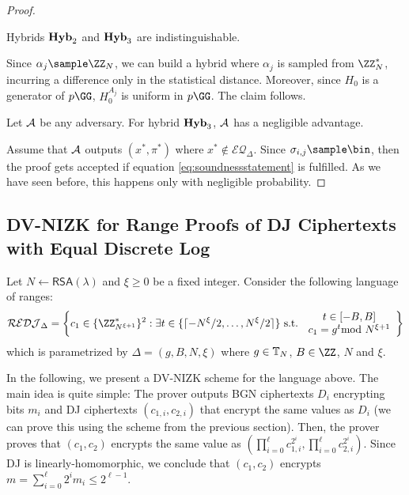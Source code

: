 \begin{proof}
\begin{claim}
Hybrids $\mathsf{\mathbf{Hyb}}_2$ and $\mathsf{\mathbf{Hyb}}_3$ are indistinguishable.
\end{claim}

Since $\alpha_j\sample \ZZ_N$, we can build a hybrid where $\alpha_j$ is sampled from $\ZZ_N^*$, incurring a difference only in the statistical distance. Moreover, since $H_0$ is a generator of $p\GG$, $H_0^{A_j}$ is uniform in $p\GG$. The claim follows.

 \begin{claim}
 \label{claim:neglsound}
 Let $\mathcal{A}$ be any adversary. For hybrid $\mathsf{\mathbf{Hyb}}_3$, $\mathcal{A}$ has a negligible advantage.
 \end{claim}

Assume that $\mathcal{A}$ outputs $(x^*,\pi^*)$ where $x^*\notin \mathcal{EQ}_\Delta$. Since $\sigma_{i,j}\sample \bin$, then the proof gets accepted if equation \ref{eq:soundnessstatement} is fulfilled. As we have seen before, this happens only with negligible probability.

\end{proof}



\subsection{DV-NIZK for Range Proofs of DJ Ciphertexts with Equal Discrete Log}

Let $N\leftarrow\mathsf{RSA}(\lambda)$ and $\xi\geq 0$ be a fixed integer. 
Consider the following language of ranges: 
$$\mathcal{REDJ}_{\Delta}=\left\{c_1\in \{\ZZ^\ast_{N^{\xi+1}}\}^2
:\exists t\in \{\lceil- N^\xi/2,\dots, N^\xi/2 \rceil\}%
\text{ s.t. }\begin{array}{c}
     t\in [-B,B] \\
     c_1=g^t \smod N^{\xi+1}\\ 
\end{array}\right \}$$ which is parametrized by $\Delta=(g,B,N,\xi) $ where $g\in \mathbb{T}_N$, $B\in\ZZ$,  $N$ and $\xi$.


In the following, we present a DV-NIZK scheme for the language above. The main idea is quite simple: The prover outputs BGN ciphertexts $D_i$ encrypting bits $m_i$ and DJ ciphertexts $(c_{1,i},c_{2,i})$ that encrypt the same values as $D_i$ (we can prove this using the scheme from the previous section). Then, the prover proves that $(c_1,c_2)$ encrypts the same value as $\left(\prod_{i=0}^\ell c_{1,i}^{2^i},\prod_{i=0}^\ell c_{2,i}^{2^i}\right)$. Since DJ is linearly-homomorphic, we conclude that $(c_1,c_2)$ encrypts $m=\sum_{i=0}^\ell 2^i m_i \leq 2^{\ell-1}$.


